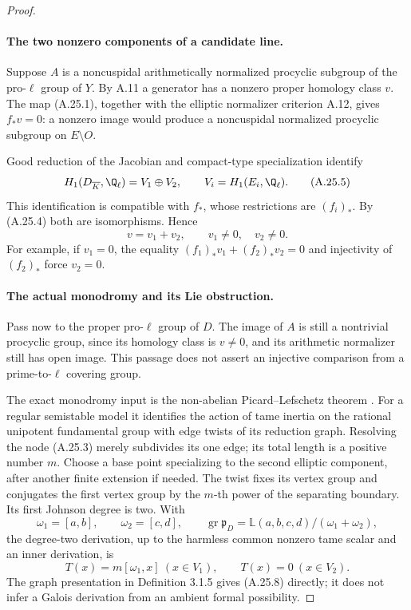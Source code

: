 \begin{proof}
\paragraph{The two nonzero components of a candidate line.}
Suppose $A$ is a noncuspidal arithmetically normalized
procyclic subgroup of the pro-$\ell$ group of $Y$.
By A.11 a generator has a nonzero proper homology
class $v$. The map (A.25.1), together with the
elliptic normalizer criterion A.12, gives
$f_*v=0$: a nonzero image would produce a
noncuspidal normalized procyclic subgroup on
$E\setminus O$.

Good reduction of the Jacobian and compact-type
specialization identify
\[
 H_1(D_{\overline K},\Q_\ell)=V_1\oplus V_2,\qquad
 V_i=H_1(E_i,\Q_\ell).
                                                        \tag{A.25.5}
\]
This identification is compatible with $f_*$, whose
restrictions are $(f_i)_*$. By (A.25.4) both are
isomorphisms. Hence
\[
                  v=v_1+v_2,\qquad v_1\ne0,\quad v_2\ne0.
                                                        \tag{A.25.6}
\]
For example, if $v_1=0$, the equality
$(f_1)_*v_1+(f_2)_*v_2=0$ and injectivity of
$(f_2)_*$ force $v_2=0$.

\paragraph{The actual monodromy and its Lie obstruction.}
Pass now to the proper pro-$\ell$ group of $D$.
The image of $A$ is still a nontrivial procyclic
group, since its homology class is $v\ne0$, and
its arithmetic normalizer still has open image.
This passage does not assert an injective comparison
from a prime-to-$\ell$ covering group.

The exact monodromy input is the non-abelian
Picard--Lefschetz theorem
\cite[Definition 3.1.5 and Theorem 3.1.6]{fghBettsDogra}.
For a regular semistable model it identifies the
action of tame inertia on the rational unipotent
fundamental group with edge twists of its reduction
graph. Resolving the node (A.25.3) merely subdivides
its one edge; its total length is a positive number
$m$. Choose a base point specializing to the second
elliptic component, after another finite extension
if needed. The twist fixes its vertex group and
conjugates the first vertex group by the $m$-th
power of the separating boundary. Its first
Johnson degree is two. With
\[
 \omega_1=[a,b],\qquad \omega_2=[c,d],\qquad
 \operatorname{gr}\mathfrak p_D
       =\mathbb L(a,b,c,d)/(\omega_1+\omega_2),
                                                        \tag{A.25.7}
\]
the degree-two derivation, up to the harmless common
nonzero tame scalar and an inner derivation, is
\[
        T(x)=m[\omega_1,x]\ (x\in V_1),\qquad
        T(x)=0\ (x\in V_2).                              \tag{A.25.8}
\]
The graph presentation in Definition 3.1.5 gives
(A.25.8) directly; it does not infer a Galois
derivation from an ambient formal possibility.


\end{proof}

